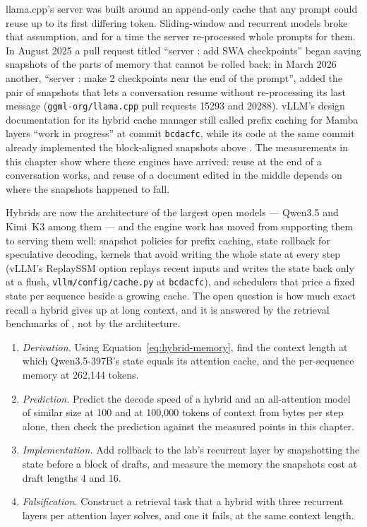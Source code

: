 llama.cpp's server was built around an append-only cache that any prompt
could reuse up to its first differing token. Sliding-window and recurrent
models broke that assumption, and for a time the server re-processed whole
prompts for them. In August 2025 a pull request titled ``server : add SWA
checkpoints'' began saving snapshots of the parts of memory that cannot be
rolled back; in March 2026 another, ``server : make 2 checkpoints near the end
of the prompt'', added the pair of snapshots that lets a conversation resume
without re-processing its last message
(\texttt{ggml-org/llama.cpp} pull requests 15293 and 20288). vLLM's design
documentation for its hybrid cache manager still called prefix caching for
Mamba layers ``work in progress'' at commit \texttt{bcdacfc}, while its code at
the same commit already implemented the block-aligned snapshots above
\cite{vllm2026hybridkv}. The measurements in this chapter show where these
engines have arrived: reuse at the end of a conversation works, and reuse of
a document edited in the middle depends on where the snapshots happened to fall.


Hybrids are now the architecture of the largest open models --- Qwen3.5 and
Kimi~K3 among them --- and the engine work has moved from supporting them to
serving them well: snapshot policies for prefix caching, state rollback for
speculative decoding, kernels that avoid writing the whole state at every step
(vLLM's ReplaySSM option replays recent inputs and writes the state back only
at a flush, \texttt{vllm/config/cache.py} at \texttt{bcdacfc}), and schedulers
that price a fixed state per sequence beside a growing cache. The open question
is how much exact recall a hybrid gives up at long context, and it is answered
by the retrieval benchmarks of , not by the architecture.

\ExercisesSection

\begin{enumerate}
\item \emph{Derivation.} Using Equation~\ref{eq:hybrid-memory}, find the
  context length at which Qwen3.5-397B's state equals its attention cache, and
  the per-sequence memory at 262,144 tokens.
\item \emph{Prediction.} Predict the decode speed of a hybrid and an
  all-attention model of similar size at 100 and at 100,000 tokens of context
  from bytes per step alone, then check the prediction against the measured
  points in this chapter.
\item \emph{Implementation.} Add rollback to the lab's recurrent layer by
  snapshotting the state before a block of drafts, and measure the memory the
  snapshots cost at draft lengths 4 and 16.
\item \emph{Falsification.} Construct a retrieval task that a hybrid with
  three recurrent layers per attention layer solves, and one it fails, at the
  same context length.
\end{enumerate}

